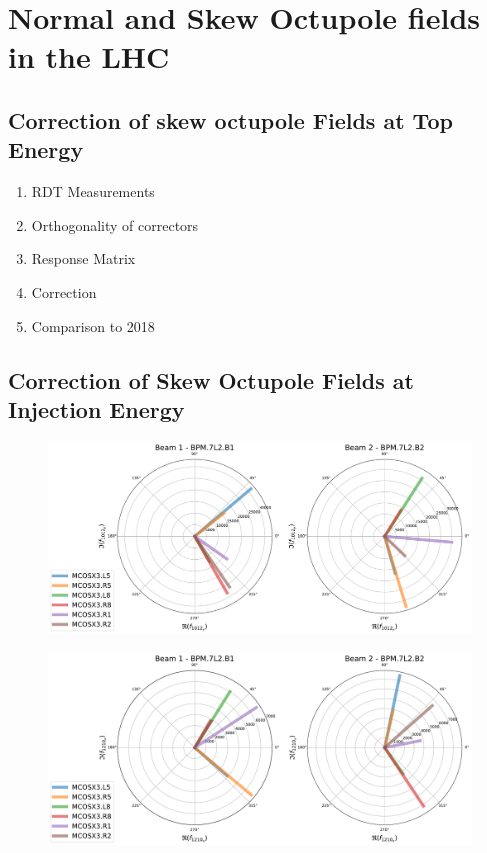 \chapter{Normal and Skew Octupole fields in the LHC}
\thumbforchapter{}
\chaptertoc{}
\newpage

\section{Correction of skew octupole Fields at Top Energy}

\begin{enumerate}
    \color{red}
    \item RDT Measurements
    \item Orthogonality of correctors
    \item Response Matrix
    \item Correction
    \item Comparison to 2018
\end{enumerate}

\section{Correction of Skew Octupole Fields at Injection Energy}

\begin{figure}[H]
    \includegraphics[width=\textwidth]{./chapters/07_octupoles/images/f1012_y_injection.pdf}
    \caption{}
    \label{fig:a4_injection_orthogonal_f1012}
\end{figure}

\begin{figure}[H]
    \includegraphics[width=\textwidth]{chapters/07_octupoles/images/f1210_x_injection.pdf}
    \caption{}
    \label{fig:a4_injection_orthogonal_f1210}
\end{figure}